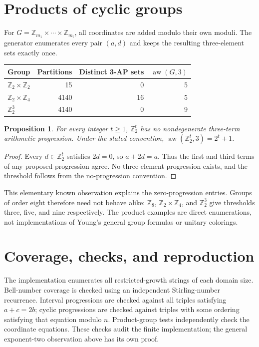 \documentclass[10pt,letterpaper]{article}
\newtheorem{proposition}{Proposition}
\newcommand{\aw}{\operatorname{aw}}
\begin{document}
\section{Products of cyclic groups}
For $G=\mathbb Z_{m_1}\times\cdots\times\mathbb Z_{m_t}$, all coordinates are
added modulo their own moduli. The generator enumerates every pair $(a,d)$
and keeps the resulting three-element sets exactly once.
\begin{center}
\begin{tabular}{lrrr}
\toprule
Group & Partitions & Distinct 3-AP sets & $\aw(G,3)$\\
\midrule
$\mathbb Z_2\times\mathbb Z_2$ & 15 & 0 & 5\\
$\mathbb Z_2\times\mathbb Z_4$ & 4140 & 16 & 5\\
$\mathbb Z_2^3$ & 4140 & 0 & 9\\
\bottomrule
\end{tabular}
\end{center}
\begin{proposition}
For every integer $t\ge1$, $\mathbb Z_2^t$ has no nondegenerate three-term
arithmetic progression. Under the stated convention,
$\aw(\mathbb Z_2^t,3)=2^t+1$.
\end{proposition}
\begin{proof}
Every $d\in\mathbb Z_2^t$ satisfies $2d=0$, so $a+2d=a$. Thus the first and
third terms of any proposed progression agree. No three-element progression
exists, and the threshold follows from the no-progression convention.
\end{proof}
This elementary known observation explains the zero-progression entries.
Groups of order eight therefore need not behave alike: $\mathbb Z_8$,
$\mathbb Z_2\times\mathbb Z_4$, and $\mathbb Z_2^3$ give thresholds three,
five, and nine respectively. The product examples are direct enumerations,
not implementations of Young's general group formulas or unitary colorings.

\section{Coverage, checks, and reproduction}
The implementation enumerates all restricted-growth strings of each domain
size. Bell-number coverage is checked using an independent Stirling-number
recurrence. Interval progressions are checked against all triples satisfying
$a+c=2b$; cyclic progressions are checked against triples with some ordering
satisfying that equation modulo $n$. Product-group tests independently check
the coordinate equations. These checks audit the finite implementation;
the general exponent-two observation above has its own proof.
\end{document}

